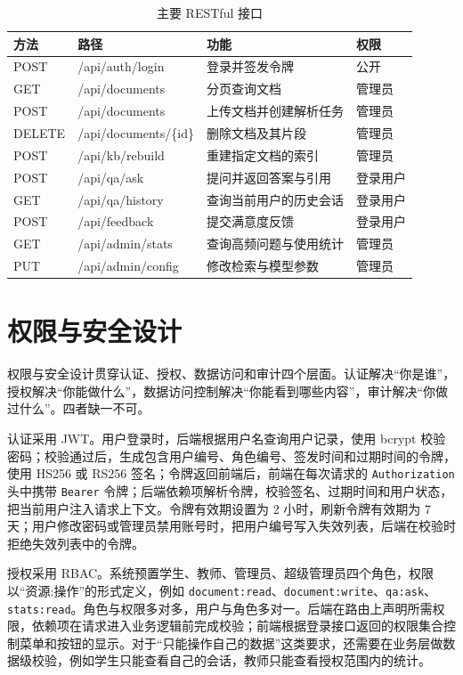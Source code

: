 \begin{table}[H]
  \centering
  \caption{主要 RESTful 接口}
  \label{tab:api}
  \renewcommand{\arraystretch}{1.2}
  \begin{tabular}{p{1.3cm}p{5.0cm}p{4.9cm}p{1.7cm}}
    \toprule
    方法 & 路径 & 功能 & 权限 \\
    \midrule
    POST & /api/auth/login & 登录并签发令牌 & 公开 \\
    GET & /api/documents & 分页查询文档 & 管理员 \\
    POST & /api/documents & 上传文档并创建解析任务 & 管理员 \\
    DELETE & /api/documents/\{id\} & 删除文档及其片段 & 管理员 \\
    POST & /api/kb/rebuild & 重建指定文档的索引 & 管理员 \\
    POST & /api/qa/ask & 提问并返回答案与引用 & 登录用户 \\
    GET & /api/qa/history & 查询当前用户的历史会话 & 登录用户 \\
    POST & /api/feedback & 提交满意度反馈 & 登录用户 \\
    GET & /api/admin/stats & 查询高频问题与使用统计 & 管理员 \\
    PUT & /api/admin/config & 修改检索与模型参数 & 管理员 \\
    \bottomrule
  \end{tabular}
\end{table}

\section{权限与安全设计}
\label{sec:security-design}

权限与安全设计贯穿认证、授权、数据访问和审计四个层面。认证解决“你是谁”，授权解决“你能做什么”，数据访问控制解决“你能看到哪些内容”，审计解决“你做过什么”。四者缺一不可。

认证采用 JWT。用户登录时，后端根据用户名查询用户记录，使用 bcrypt 校验密码；校验通过后，生成包含用户编号、角色编号、签发时间和过期时间的令牌，使用 HS256 或 RS256 签名；令牌返回前端后，前端在每次请求的 \texttt{Authorization} 头中携带 \texttt{Bearer} 令牌；后端依赖项解析令牌，校验签名、过期时间和用户状态，把当前用户注入请求上下文。令牌有效期设置为 2 小时，刷新令牌有效期为 7 天；用户修改密码或管理员禁用账号时，把用户编号写入失效列表，后端在校验时拒绝失效列表中的令牌。

授权采用 RBAC。系统预置学生、教师、管理员、超级管理员四个角色，权限以“资源:操作”的形式定义，例如 \texttt{document:read}、\texttt{document:write}、\texttt{qa:ask}、\texttt{stats:read}。角色与权限多对多，用户与角色多对一。后端在路由上声明所需权限，依赖项在请求进入业务逻辑前完成校验；前端根据登录接口返回的权限集合控制菜单和按钮的显示。对于“只能操作自己的数据”这类要求，还需要在业务层做数据级校验，例如学生只能查看自己的会话，教师只能查看授权范围内的统计。

